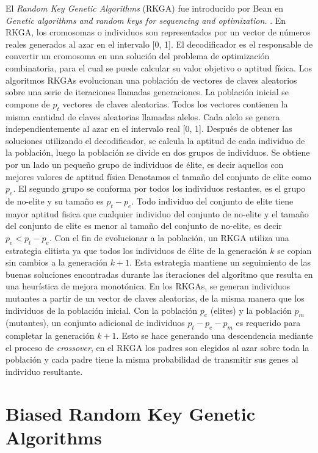 El \textit{Random Key Genetic Algorithms} (RKGA) fue introducido por Bean en \textit{Genetic algorithms and random keys for sequencing and optimization.} \cite{Bean}. En RKGA, los cromosomas o individuos son representados por un vector de números reales generados al azar en el intervalo [0, 1]. El decodificador es el responsable de convertir un cromosoma en una solución del problema de optimización combinatoria, para el cual se puede calcular su valor objetivo o aptitud física. Los algoritmos RKGAs evolucionan una población de vectores de claves aleatorios sobre una serie de iteraciones llamadas generaciones. La población inicial se compone de $p_t$ vectores de claves aleatorias. Todos los vectores contienen la misma cantidad de claves aleatorias llamadas alelos. Cada alelo se genera independientemente al azar en el intervalo real [0, 1]. Después de obtener las soluciones utilizando el decodificador, se calcula la aptitud de cada individuo de la población, luego la población se divide en dos grupos de individuos. Se obtiene por un lado un pequeño grupo de individuos de élite, es decir aquellos con mejores valores de aptitud física Denotamos el tamaño del conjunto de elite como $p_e$. El segundo grupo se conforma por todos los individuos restantes, es el grupo de no-elite y su tamaño es $p_t-p_e$. Todo individuo del conjunto de elite tiene mayor aptitud fisica que cualquier individuo del conjunto de no-elite y el tamaño del conjunto de elite es menor al tamaño del conjunto de no-elite, es decir $p_e<p_t-p_e$. Con el fin de evolucionar a la población, un RKGA utiliza una estrategia elitista ya que todos los individuos de élite de la generación $k$ se copian sin cambios a la generación $k + 1$. Esta estrategia mantiene un seguimiento de las buenas soluciones encontradas durante las iteraciones del algoritmo que resulta en una heurística de mejora monotónica. En los RKGAs, se generan individuos mutantes a partir de un vector de claves aleatorias, de la misma manera que los individuos de la población inicial. Con la población $p_e$ (elites) y la población $p_m$ (mutantes), un conjunto adicional de individuos $p_t - p_e - p_m$ es requerido para completar la generación $k+1$. Esto se hace generando una descendencia mediante el proceso de \textit{crossover}, en el RKGA los padres son elegidos al azar sobre toda la población y cada padre tiene la misma probabilidad de transmitir sus genes al individuo resultante.

\section{Biased Random Key Genetic Algorithms}\label{sec:brkga}

